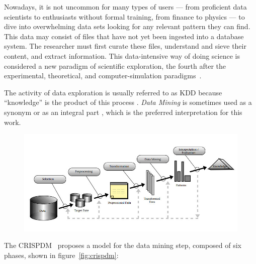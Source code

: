
Nowadays, it is not uncommon for many types of users
--- from proficient data scientists to enthusiasts without formal
training, from finance to physics --- to dive into overwhelming
data sets looking for any relevant pattern they can find. This data
may consist of files that have not yet been ingested into a
database system. The researcher must first curate
these files, understand and sieve their content, and 
extract information. This data-intensive way of doing science is considered
a new paradigm of scientific exploration, the fourth after the experimental, theoretical, and computer-simulation paradigms~\cite{bell2009beyond,hey2009the}.

The activity of data exploration is usually referred to as \gls{KDD}
because ``knowledge'' is the product of this process
\parencite{Piatetsky-Shapiro1991,Fayyad1996a}.
\emph{Data Mining} is sometimes used as a synonym or as an integral
part \parencite{Fayyad1996a,Reinartz1999}, which is
the preferred interpretation for this work.

\begin{figure}[htbp]
    \centering
    \includegraphics[width=\linewidth]{images/1_introduction/kdd.jpg}
    \caption{}
    \label{fig:kdd}
\end{figure}

The \gls{CRISPDM}~\cite{Shearer2000} proposes a model for the data
mining step, composed of six phases, shown in figure~\ref{fig:crispdm}:

